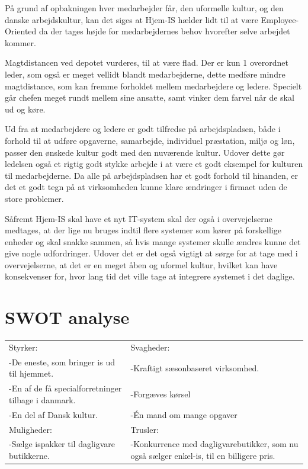 På grund af opbakningen hver medarbejder får, den uformelle kultur, og den danske arbejdskultur, kan det siges at Hjem-IS hælder lidt til at være Employee-Oriented da der tages højde for medarbejdernes behov hvorefter selve arbejdet kommer. 

Magtdistancen ved depotet vurderes, til at være flad. Der er kun 1 overordnet leder, som også er meget vellidt blandt medarbejderne, dette medføre mindre magtdistance, som kan fremme forholdet mellem medarbejdere og ledere. Specielt går chefen meget rundt mellem sine ansatte, samt vinker dem farvel når de skal ud og køre. 

Ud fra at medarbejdere og ledere er godt tilfredse på arbejdspladsen, både i forhold til at udføre opgaverne, samarbejde, individuel præstation, miljø og løn, passer den ønskede kultur godt med den nuværende kultur. Udover dette gør ledelsen også et rigtig godt stykke arbejde i at være et godt eksempel for kulturen til medarbejderne. Da alle på arbejdspladsen har et godt forhold til hinanden, er det et godt tegn på at virksomheden kunne klare ændringer i firmaet uden de store problemer. 

Såfremt Hjem-IS skal have et nyt IT-system skal der også i overvejelserne medtages, at der lige nu bruges indtil flere systemer som kører på forskellige enheder og skal snakke sammen, så hvis mange systemer skulle ændres kunne det give nogle udfordringer. Udover det er det også vigtigt at sørge for at tage med i overvejelserne, at det er en meget åben og uformel kultur, hvilket kan have konsekvenser for, hvor lang tid det ville tage at integrere systemet i det daglige.

\section{SWOT analyse}
\begin{center}
\begin{tabular}{ |p{200pt}|p{200pt}| }
    \hline
    Styrker: & Svagheder: \\
    -De eneste, som bringer is ud til hjemmet. & -Kraftigt sæsonbaseret virksomhed. \\
    -En af de få specialforretninger tilbage i danmark. & -Forgæves kørsel \\
    -En del af Dansk kultur. & -Én mand om mange opgaver \\
    \hline
    Muligheder: & Trusler: \\
    -Sælge ispakker til dagligvare butikkerne. & -Konkurrence med dagligvarebutikker, som nu også sælger enkel-is, til en billigere pris. \\
    \hline
\end{tabular}
\end{center}

